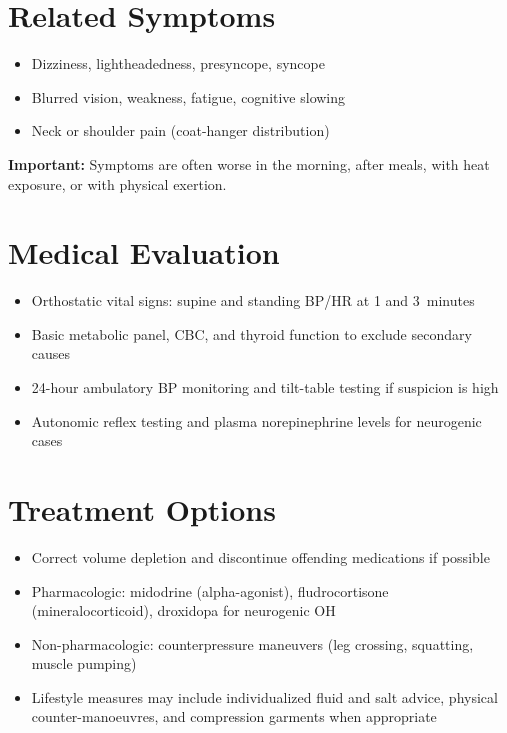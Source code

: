 \section*{Related Symptoms}
\begin{itemize}
  \item Dizziness, lightheadedness, presyncope, syncope
  \item Blurred vision, weakness, fatigue, cognitive slowing
  \item Neck or shoulder pain (coat-hanger distribution)
\end{itemize}
\textbf{Important:} Symptoms are often worse in the morning, after meals, with heat exposure, or with physical exertion.

\section*{Medical Evaluation}
\begin{itemize}
  \item Orthostatic vital signs: supine and standing BP/HR at 1 and 3~minutes
  \item Basic metabolic panel, CBC, and thyroid function to exclude secondary causes
  \item 24-hour ambulatory BP monitoring and tilt-table testing if suspicion is high
  \item Autonomic reflex testing and plasma norepinephrine levels for neurogenic cases
\end{itemize}

\section*{Treatment Options}
\begin{itemize}
  \item Correct volume depletion and discontinue offending medications if possible
  \item Pharmacologic: midodrine (alpha-agonist), fludrocortisone (mineralocorticoid), droxidopa for neurogenic OH
  \item Non-pharmacologic: counterpressure maneuvers (leg crossing, squatting, muscle pumping)
  \item Lifestyle measures may include individualized fluid and salt advice, physical counter-manoeuvres, and compression garments when appropriate
\end{itemize}

